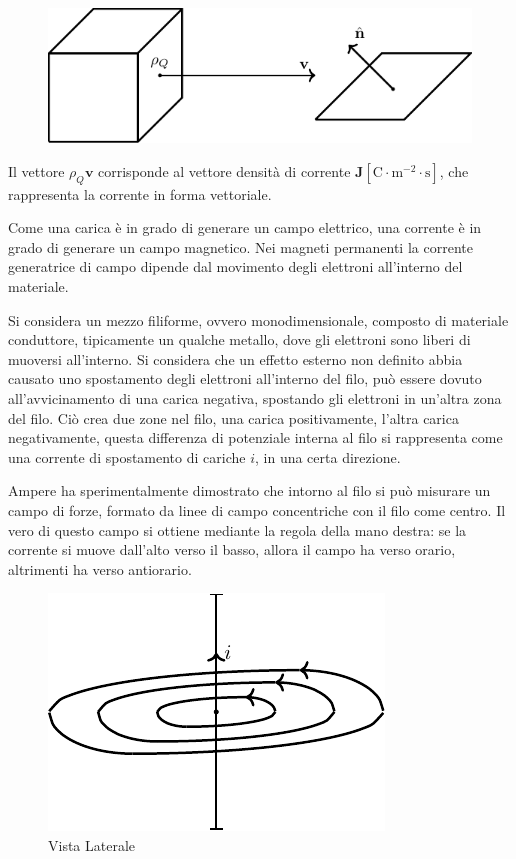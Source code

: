 \documentclass{article}
\newcommand{\vect}[1]{\boldsymbol{\mathbf{#1}}}
\newcommand{\SI}[1]{\mathrm{#1}}
\numberwithin{equation}{subsection}
\begin{document}
\begin{figure}[H]%
    \centering
    \includegraphics{portata.pdf}%
    \label{fig:portata}
\end{figure}

Il vettore $\rho_Q\vect{v}$ corrisponde al vettore densità di corrente $\vect{J}\left[\SI{C}\cdot\SI{m}^{-2}\cdot\SI{s}\right]$, che rappresenta la corrente in forma vettoriale. 



Come una carica è in grado di generare un campo elettrico, una corrente è in grado di generare un campo magnetico. Nei magneti permanenti la corrente generatrice di campo 
dipende dal movimento degli elettroni all'interno del materiale. 

Si considera un mezzo filiforme, ovvero monodimensionale, composto di materiale conduttore, tipicamente un qualche 
metallo, dove gli elettroni sono liberi di muoversi all'interno. Si considera che un effetto esterno non definito abbia causato uno spostamento degli elettroni all'interno del filo, 
può essere dovuto all'avvicinamento di una carica negativa, spostando gli elettroni in un'altra zona del filo. Ciò crea due zone nel filo, una carica positivamente, l'altra 
carica negativamente, questa differenza di potenziale interna al filo si rappresenta come una corrente di spostamento di cariche $i$, in una certa direzione. 

Ampere ha sperimentalmente dimostrato che intorno al filo si può misurare un campo di forze, formato da linee di campo concentriche con il filo come centro. Il vero di questo 
campo si ottiene mediante la regola della mano destra: se la corrente si muove dall'alto verso il basso, allora il campo ha verso orario, altrimenti ha verso antiorario. 

\begin{figure}[H]%
    \centering
    \includegraphics{corrente-filo.pdf}%
    \caption{Vista Laterale}
    \label{fig:corrente-filo}
\end{figure}
\end{document}
